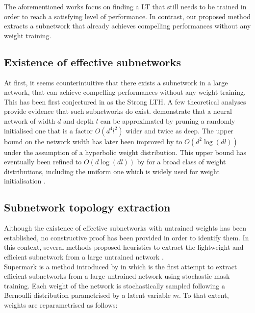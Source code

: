 The aforementioned works
\cite{DBLP:conf/iclr/FrankleC19,DBLP:conf/icml/FrankleD0C20,DBLP:conf/iclr/LiuSZHD19}
focus on finding a \acl{LT} that still needs to be trained in order to reach a
satisfying level of performance. In contrast, our proposed method extracts a
subnetwork that already achieves compelling performances without any weight
training.\\ 


\subsection{Existence of effective subnetworks} 
At first, it seems counterintuitive that there exists a subnetwork in a large
network, that can achieve compelling performances without any weight training.
This has been first conjectured in \cite{DBLP:conf/cvpr/RamanujanWKFR20} as the
Strong \acl{LTH}. A few theoretical analyses provide evidence that such
subnetworks do exist. \cite{DBLP:conf/icml/MalachYSS20} demonstrate that a
neural network of width $d$ and depth $l$ can be approximated by pruning a
randomly initialised one that is a factor $O(d^4l^2)$ wider and twice as deep.
The upper bound on the network width has later been improved by
\cite{DBLP:conf/nips/OrseauHR20} to $O(d^2\log(dl))$ under the assumption of a
hyperbolic weight distribution. This upper bound has eventually been refined to
$O(d\log(dl))$ by \cite{DBLP:conf/nips/PensiaRNVP20} for a broad class of weight
distributions, including the uniform one which is widely used for weight
initialisation \cite{DBLP:conf/iccv/HeZRS15}.\\

\subsection{Subnetwork topology extraction}\label{sec:chap2:subnetwork_topology_extraction}
Although the existence of effective subnetworks with untrained weights has been
established, no constructive proof has been provided in order to identify them.
In this context, several methods proposed heuristics to extract the lightweight
and efficient subnetwork from a large untrained network
\cite{DBLP:conf/nips/ZhouLLY19,DBLP:conf/cvpr/RamanujanWKFR20}.\\

Supermark is a method introduced by \citeauthor{DBLP:conf/nips/ZhouLLY19} in
\cite{DBLP:conf/nips/ZhouLLY19} which is the first attempt to extract efficient
subnetworks from a large untrained network using stochastic mask training. Each
weight of the network is stochastically sampled following a Bernoulli
distribution parametrised by a latent variable $m$. To that extent, weights are
reparametrised as follows:\\

